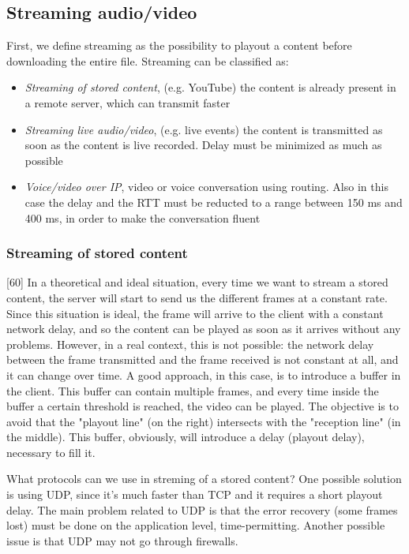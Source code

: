 \subsection{Streaming audio/video}
First, we define streaming as the possibility to playout a content before downloading the entire file. Streaming can be classified as:
\begin{itemize}
    \item \textit{Streaming of stored content}, (e.g. YouTube) the content is already present in a remote server, which can transmit faster
    \item \textit{Streaming live audio/video}, (e.g. live events) the content is transmitted as soon as the content is live recorded. Delay must be minimized as much as possible
    \item \textit{Voice/video over IP}, video or voice conversation using routing. Also in this case the delay and the RTT must be reducted to a range between 150 ms and 400 ms, in order to make the conversation fluent
\end{itemize}

\subsubsection{Streaming of stored content}
[60] In a theoretical and ideal situation, every time we want to stream a stored content, the server will start to send us the different frames at a constant rate. Since this situation is ideal, the frame will arrive to the client with a constant network delay, and so the content can be played as soon as it arrives without any problems. However, in a real context, this is not possible: the network delay between the frame transmitted and the frame received is not constant at all, and it can change over time. A good approach, in this case, is to introduce a buffer in the client. This buffer can contain multiple frames, and every time inside the buffer a certain threshold is reached, the video can be played. The objective is to avoid that the "playout line" (on the right) intersects with the "reception line" (in the middle). This buffer, obviously, will introduce a delay (playout delay), necessary to fill it.

What protocols can we use in streming of a stored content?
One possible solution is using UDP, since it's much faster than TCP and it requires a short playout delay. The main problem related to UDP is that the error recovery (some frames lost) must be done on the application level, time-permitting. Another possible issue is that UDP may not go through firewalls.

